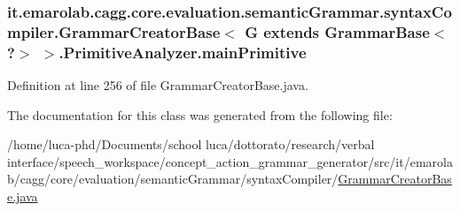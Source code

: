 \hypertarget{classit_1_1emarolab_1_1cagg_1_1core_1_1evaluation_1_1semanticGrammar_1_1syntaxCompiler_1_1Gramma476c64fc54be5b96aaf6048986cec760_a1e49a575da03e6301db21581a30f2367}{
\subsubsection[{main\-Primitive}]{ it.\-emarolab.\-cagg.\-core.\-evaluation.\-semantic\-Grammar.\-syntax\-Compiler.\-Grammar\-Creator\-Base$<$ G extends Grammar\-Base$<$ ?$>$ $>$.Primitive\-Analyzer.\-main\-Primitive\hspace{0.3cm}{\ttfamily [private]}}}\label{classit_1_1emarolab_1_1cagg_1_1core_1_1evaluation_1_1semanticGrammar_1_1syntaxCompiler_1_1Gramma476c64fc54be5b96aaf6048986cec760_a1e49a575da03e6301db21581a30f2367}


Definition at line 256 of file Grammar\-Creator\-Base.\-java.



The documentation for this class was generated from the following file\-:\begin{DoxyCompactItemize}
\item 
/home/luca-\/phd/\-Documents/school luca/dottorato/research/verbal interface/speech\-\_\-workspace/concept\-\_\-action\-\_\-grammar\-\_\-generator/src/it/emarolab/cagg/core/evaluation/semantic\-Grammar/syntax\-Compiler/\hyperlink{GrammarCreatorBase_8java}{Grammar\-Creator\-Base.\-java}\end{DoxyCompactItemize}
